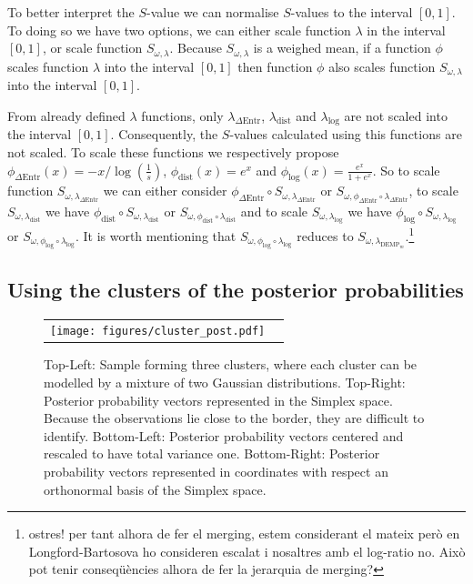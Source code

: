 \documentclass[submit]{smj}
\theoremstyle{definition}
\begin{document}
To better interpret the $S$-value we can normalise $S$-values to the interval $\left[0,1\right]$. To doing so we have two options, we can either scale function $\lambda$ in the interval $\left[0,1\right]$, or scale function 
$S_{\omega, \lambda}$. Because $S_{\omega, \lambda}$ is a weighed mean, if a function $\phi$ scales function $\lambda$ into the interval $\left[0,1\right]$ then function $\phi$ also scales function $S_{\omega, \lambda}$ into the interval $\left[0,1\right]$.

From already defined $\lambda$ functions, only $\lambda_{\Delta\text{Entr}}$, $\lambda_{\text{dist}}$ and 
$\lambda_{\log}$ are not scaled into the interval $\left[0,1\right]$. Consequently, the $S$-values calculated using this functions are not scaled. To scale these functions we respectively propose  $\phi_{\Delta\text{Entr}}(x) = -x/{\log(\frac{1}{s})}$, $\phi_{\text{dist}}(x) = e^x$ and $\phi_{\log}(x) = \frac{e^x}{1+e^x}$. So 
to scale function $S_{\omega, \lambda_{\Delta\text{Entr}}}$ we can either consider $\phi_{\Delta\text{Entr}} \circ S_{\omega, \lambda_{\Delta\text{Entr}}}$ or $S_{\omega, \phi_{\Delta\text{Entr}} \circ \lambda_{\Delta\text{Entr}}}$, 
to scale $S_{\omega, \lambda_{\text{dist}}}$ we have $\phi_{\text{dist}} \circ S_{\omega, \lambda_{\text{dist}}}$ or $S_{\omega, \phi_{\text{dist}} \circ \lambda_{\text{dist}}}$ and 
to scale $S_{\omega, \lambda_{\log}}$ we have $\phi_{\log} \circ S_{\omega, \lambda_{\log}}$ or $S_{\omega, \phi_{\log} \circ \lambda_{\log}}$. It is worth mentioning that $S_{\omega, \phi_{\log} \circ \lambda_{\log}}$ reduces to $S_{\omega, \lambda_{\text{DEMP}_m}}$.\footnote{ostres! per tant alhora de fer el merging, estem considerant el mateix però en Longford-Bartosova ho consideren escalat i nosaltres amb el log-ratio no. Això pot tenir conseqüències alhora de fer la jerarquia de merging?}


\subsection{Using the clusters of the posterior probabilities}\label{coda_clusters}

\begin{figure}[htbp]
\begin{center}
\begin{tabular}{cc}
  \texttt{[image: figures/cluster\_post.pdf]} \\
 \end{tabular}
 \caption{Top-Left: Sample forming three clusters, where each cluster can be modelled by a mixture of two Gaussian distributions. Top-Right: Posterior probability vectors represented in the Simplex space. Because the observations lie close to the border, they are difficult to identify. Bottom-Left: Posterior probability vectors centered and rescaled to have total variance one. Bottom-Right: Posterior probability vectors represented in coordinates with respect an orthonormal basis of the Simplex space.}\label{cluster_post}
\end{center}
\end{figure}
\end{document}

